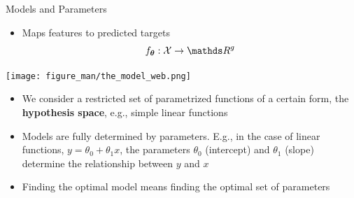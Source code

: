 \documentclass[11pt,compress,t,notes=noshow, xcolor=table]{beamer}
\begin{document}
\begin{vbframe}{Models and Parameters}
\small
\begin{itemize}
    \item Maps features to predicted targets
     $$f_{\thetav} : \Xspace \rightarrow \R^g$$ 

\end{itemize}

\begin{center}
  \texttt{[image: figure\_man/the\_model\_web.png]}
\end{center}

\small
\begin{itemize}
\item  We consider a restricted set of parametrized functions of a certain form, the \textbf{hypothesis space}, e.g., simple linear functions
\item Models are fully determined by parameters. E.g., in the case of linear functions, $y = \theta_0 + \theta_1 x $, the parameters $\theta_0$ (intercept) and $\theta_1$ (slope) determine the relationship between $y$ and $x$
\item Finding the optimal model means finding the optimal set of parameters
\end{itemize}

 
\end{vbframe}
\end{document}
